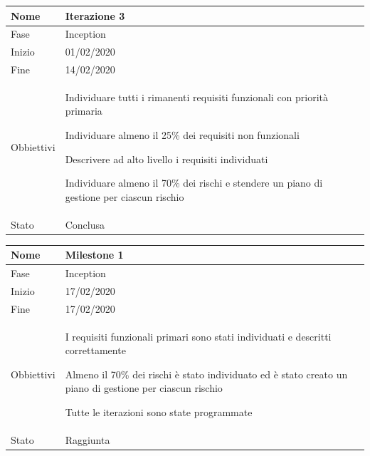 \begin{center}
\begin{tabular}{ |p{2cm}|p{10cm}|  }
\hline
Nome & Iterazione 3 \\\hline
Fase & Inception \\\hline
Inizio & 01/02/2020 \\\hline
Fine &  14/02/2020 \\\hline
Obbiettivi & 
	\begin{compactitem}
		\item Individuare tutti i rimanenti requisiti funzionali con priorità primaria
		\item Individuare almeno il 25\% dei requisiti non funzionali
		\item Descrivere ad alto livello i requisiti individuati
		\item Individuare almeno il 70\% dei rischi e stendere un piano di gestione per ciascun rischio
	\end{compactitem}\\\hline
Stato &  Conclusa \\\hline %
\end{tabular}
\label{table:3}\newline

\begin{tabular}{ |p{2cm}|p{10cm}|  }
\hline
Nome & Milestone 1\\\hline
Fase & Inception \\\hline
Inizio & 17/02/2020 \\\hline
Fine &  17/02/2020 \\\hline
Obbiettivi & 
	\begin{compactitem}
		\item I requisiti funzionali primari sono stati individuati e descritti correttamente
		\item Almeno il 70\% dei rischi è stato individuato ed è stato creato un piano di gestione per ciascun rischio
		\item Tutte le iterazioni sono state programmate
	\end{compactitem}\\\hline
Stato &  Raggiunta \\\hline
\end{tabular}
\label{table:milestone1}\newline


\end{center}
